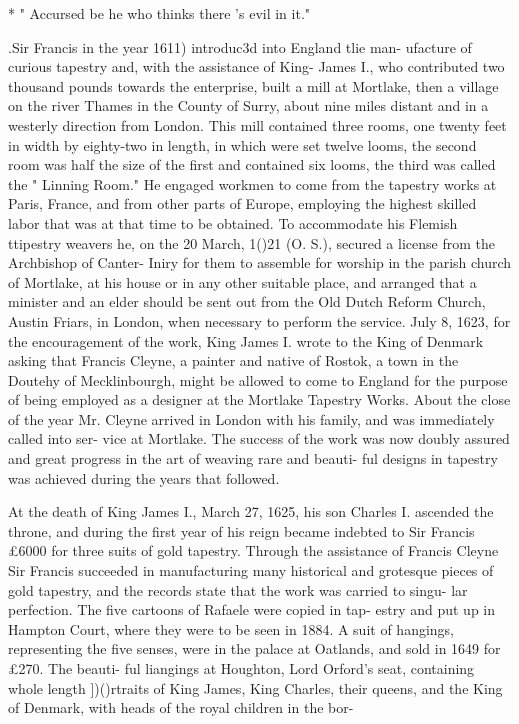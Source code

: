 \documentclass{book}
\begin{document}
* " Accursed be he who thinks there 's evil in it." 




.Sir Francis in the year 1611) introduc3d into England tlie man- 
ufacture of curious tapestry and, with the assistance of King- 
James I., who contributed two thousand pounds towards the 
enterprise, built a mill at Mortlake, then a village on the river 
Thames in the County of Surry, about nine miles distant and in 
a westerly direction from London. This mill contained three 
rooms, one twenty feet in width by eighty-two in length, in which 
were set twelve looms, the second room was half the size of the 
first and contained six looms, the third was called the " Linning 
Room." He engaged workmen to come from the tapestry works 
at Paris, France, and from other parts of Europe, employing the 
highest skilled labor that was at that time to be obtained. To 
accommodate his Flemish ttipestry weavers he, on the 20 March, 
1()21 (O. S.), secured a license from the Archbishop of Canter- 
Iniry for them to assemble for worship in the parish church of 
Mortlake, at his house or in any other suitable place, and arranged 
that a minister and an elder should be sent out from the Old Dutch 
Reform Church, Austin Friars, in London, when necessary to 
perform the service. July 8, 1623, for the encouragement of the 
work, King James I. wrote to the King of Denmark asking that 
Francis Cleyne, a painter and native of Rostok, a town in the 
Doutehy of Mecklinbourgh, might be allowed to come to England 
for the purpose of being employed as a designer at the Mortlake 
Tapestry Works. About the close of the year Mr. Cleyne arrived 
in London with his family, and was immediately called into ser- 
vice at Mortlake. The success of the work was now doubly 
assured and great progress in the art of weaving rare and beauti- 
ful designs in tapestry was achieved during the years that followed. 

At the death of King James I., March 27, 1625, his son Charles 
I. ascended the throne, and during the first year of his reign became 
indebted to Sir Francis £6000 for three suits of gold tapestry. 
Through the assistance of Francis Cleyne Sir Francis succeeded 
in manufacturing many historical and grotesque pieces of gold 
tapestry, and the records state that the work was carried to singu- 
lar perfection. The five cartoons of Rafaele were copied in tap- 
estry and put up in Hampton Court, where they were to be seen 
in 1884. A suit of hangings, representing the five senses, were 
in the palace at Oatlands, and sold in 1649 for £270. The beauti- 
ful liangings at Houghton, Lord Orford's seat, containing whole 
length ])()rtraits of King James, King Charles, their queens, and 
the King of Denmark, with heads of the royal children in the bor- 
\end{document}

